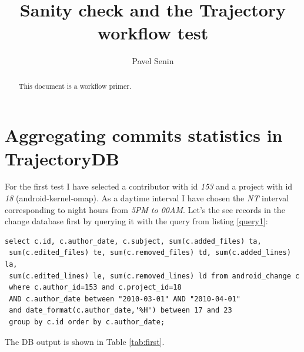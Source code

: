 \documentclass[a4paper,10pt]{article}
\title{Sanity check and the Trajectory workflow test}
\author{Pavel Senin}
\numberwithin{equation}{subsection}
\begin{document}
\maketitle

\begin{abstract}
This document is a workflow primer.
\end{abstract}

\section{Aggregating commits statistics in TrajectoryDB}
For the first test I have selected a contributor with id \emph{153} and a project with id \emph{18} (android-kernel-omap). 
As a daytime interval I have chosen the \emph{NT} interval corresponding to night hours from \emph{5PM to 00AM}. 
Let's the see records in the change database first by querying it with the query from listing \ref{query1}:
\begin{lstlisting}[label=query1,caption=Data summary retrieval SQL query]
select c.id, c.author_date, c.subject, sum(c.added_files) ta, 
 sum(c.edited_files) te, sum(c.removed_files) td, sum(c.added_lines) la, 
 sum(c.edited_lines) le, sum(c.removed_lines) ld from android_change c 
 where c.author_id=153 and c.project_id=18 
 AND c.author_date between "2010-03-01" AND "2010-04-01"
 and date_format(c.author_date,'%H') between 17 and 23
 group by c.id order by c.author_date;
\end{lstlisting}

The DB output is shown in Table \ref{tab:first}.
\end{document}
